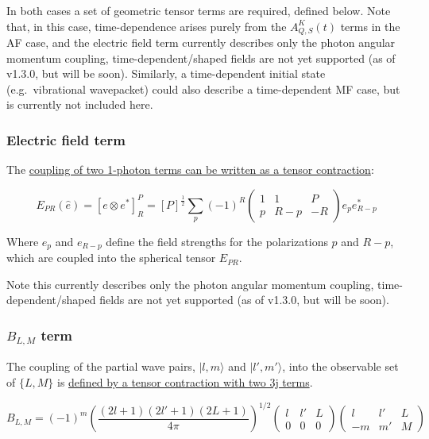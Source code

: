 In both cases a set of geometric tensor terms are required, defined
below. Note that, in this case, time-dependence arises purely from the
\(A_{Q,S}^{K}(t)\) terms in the AF case, and the electric field term
currently describes only the photon angular momentum coupling,
time-dependent/shaped fields are not yet supported (as of v1.3.0, but
will be soon). Similarly, a time-dependent initial state
(e.g.~vibrational wavepacket) could also describe a time-dependent MF
case, but is currently not included here.

\subsubsection{Electric field term}\label{electric-field-term}

The
\href{https://epsproc.readthedocs.io/en/latest/methods/geometric_method_dev_260220_090420_tidy.html\#E_\%7BP,R\%7D-tensor}{coupling
of two 1-photon terms can be written as a tensor contraction}:

\begin{equation}
E_{PR}(\hat{e})=[e\otimes e^{*}]_{R}^{P}=[P]^{\frac{1}{2}}\sum_{p}(-1)^{R}\left(\begin{array}{ccc}
1 & 1 & P\\
p & R-p & -R
\end{array}\right)e_{p}e_{R-p}^{*}\label{eq:EPR-defn-1}
\end{equation}

Where \(e_{p}\) and \(e_{R-p}\) define the field strengths for the
polarizations \(p\) and \(R-p\), which are coupled into the spherical
tensor \(E_{PR}\).

Note this currently describes only the photon angular momentum coupling,
time-dependent/shaped fields are not yet supported (as of v1.3.0, but
will be soon).

\subsubsection{\texorpdfstring{\(B_{L,M}\)
term}{B\_\{L,M\} term}}\label{b_lm-term}

The coupling of the partial wave pairs, \(|l,m\rangle\) and
\(|l',m'\rangle\), into the observable set of \(\{L,M\}\) is
\href{https://epsproc.readthedocs.io/en/latest/methods/geometric_method_dev_260220_090420_tidy.html\#B_\%7BL,M\%7D-term}{defined
by a tensor contraction with two 3j terms}.

\begin{equation}
B_{L,M}=(-1)^{m}\left(\frac{(2l+1)(2l'+1)(2L+1)}{4\pi}\right)^{1/2}\left(\begin{array}{ccc}
l & l' & L\\
0 & 0 & 0
\end{array}\right)\left(\begin{array}{ccc}
l & l' & L\\
-m & m' & M
\end{array}\right)
\end{equation}

